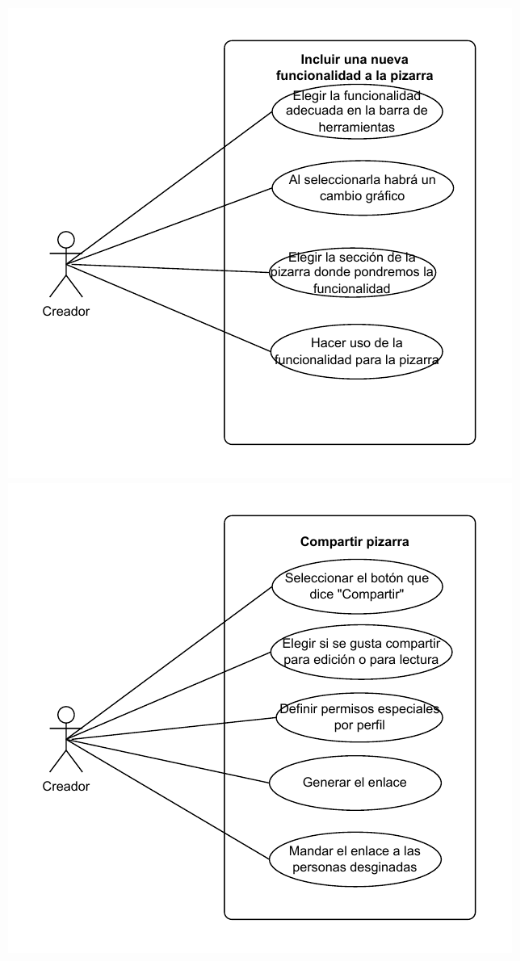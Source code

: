 \documentclass[a4paper, oneside, final]{scrartcl}
\begin{document}
\includegraphics[width=\textwidth]{images/CasoUso6.pdf}
\includegraphics[width=\textwidth]{images/CasoUso7.pdf}






\end{document}
